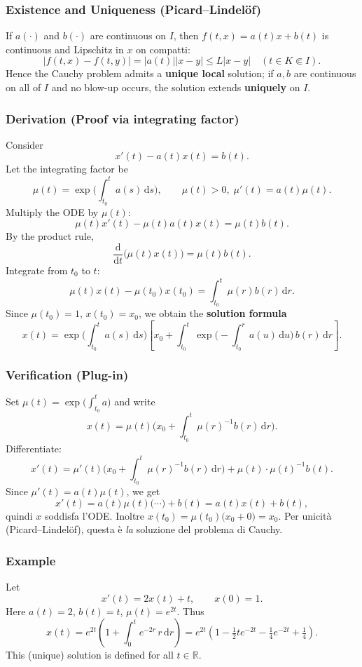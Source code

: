 \documentclass[12pt,a4paper]{book}
\theoremstyle{remark}
\newcommand{\RR}{\mathbb{R}}
\newcommand{\dd}{\mathrm{d}}
\begin{document}
\subsubsection*{Existence and Uniqueness (Picard–Lindel\"of)}
If $a(\cdot)$ and $b(\cdot)$ are continuous on $I$, then $f(t,x)=a(t)x+b(t)$ is continuous and Lipschitz in $x$ on compatti: 
\[
|f(t,x)-f(t,y)|=|a(t)||x-y| \le L|x-y| \quad (t\in K\Subset I).
\]
Hence the Cauchy problem admits a \textbf{unique local} solution; if $a,b$ are continuous on all of $I$ and no blow-up occurs, the solution extends \textbf{uniquely} on $I$.

\subsubsection*{Derivation (Proof via integrating factor)}
Consider
\[
x'(t)-a(t)x(t)=b(t).
\]
Let the integrating factor be
\[
\mu(t)=\exp\!\Big(\int_{t_0}^t a(s)\,\dd s\Big),\qquad \mu(t)>0,\;\mu'(t)=a(t)\mu(t).
\]
Multiply the ODE by $\mu(t)$:
\[
\mu(t)x'(t)-\mu(t)a(t)x(t)=\mu(t)b(t).
\]
By the product rule,
\[
\frac{\dd}{\dd t}\big(\mu(t)x(t)\big)=\mu(t)b(t).
\]
Integrate from $t_0$ to $t$:
\[
\mu(t)x(t)-\mu(t_0)x(t_0)=\int_{t_0}^t \mu(r)b(r)\,\dd r.
\]
Since $\mu(t_0)=1$, $x(t_0)=x_0$, we obtain the \textbf{solution formula}
\[
\boxed{\;
x(t)=\exp\!\Big(\int_{t_0}^t a(s)\,\dd s\Big)\left[
x_0+\int_{t_0}^t \exp\!\Big(-\int_{t_0}^r a(u)\,\dd u\Big)\,b(r)\,\dd r
\right].\;}
\]

\subsubsection*{Verification (Plug-in)}
Set $\mu(t)=\exp\!\big(\int_{t_0}^t a\big)$ and write
\[
x(t)=\mu(t)\Big(x_0+\int_{t_0}^t \mu(r)^{-1}b(r)\,\dd r\Big).
\]
Differentiate:
\[
x'(t)=\mu'(t)\Big(x_0+\int_{t_0}^t \mu(r)^{-1}b(r)\,\dd r\Big)+\mu(t)\cdot \mu(t)^{-1}b(t).
\]
Since $\mu'(t)=a(t)\mu(t)$, we get
\[
x'(t)=a(t)\mu(t)\Big(\cdots\Big)+b(t)=a(t)x(t)+b(t),
\]
quindi $x$ soddisfa l’ODE. Inoltre $x(t_0)=\mu(t_0)\big(x_0+0\big)=x_0$. Per unicità (Picard–Lindel\"of), questa è \emph{la} soluzione del problema di Cauchy.

\subsubsection*{Example}
Let
\[
x'(t)=2x(t)+t,\qquad x(0)=1.
\]
Here $a(t)=2$, $b(t)=t$, $\mu(t)=e^{2t}$. Thus
\[
x(t)=e^{2t}\left(1+\int_0^t e^{-2r}\,r\,\dd r\right)
= e^{2t}\left(1-\tfrac12 t e^{-2t}-\tfrac14 e^{-2t}+\tfrac14\right).
\]
This (unique) solution is defined for all $t\in\RR$.
\end{document}
